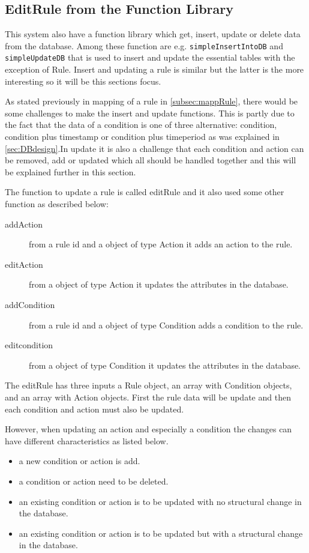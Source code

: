 \subsection{EditRule from the Function Library}
\label{subsec:dbRule}
This system also have a function library which get, insert, update or delete data from the database. Among these function are e.g. \texttt{simpleInsertIntoDB} and \texttt{simpleUpdateDB} that is used to insert and update the essential tables with the exception of Rule. Insert and updating a rule is similar but the latter is the more interesting so it will be this sections focus.

As stated previously in mapping of a rule in \vref{subsec:mappRule}, there would be some challenges to make the insert and update functions. This is partly due to the fact that the data of a condition  is one of three alternative: condition, condition plus timestamp or condition plus timeperiod as was explained in \vref{sec:DBdesign}.In update it is also a challenge that each condition and action can be removed, add or updated which all should be handled together and this will be explained further in this section. 

The function to update a rule is called editRule and it also used some other function as described below:

\begin{description}
	\item[addAction] from a rule id and a object of type Action it adds an action to the rule.
	\item[editAction] from a object of type Action it updates the attributes in the database.   
	\item[addCondition] from a rule id and a object of type Condition adds a condition to the rule.
	\item[editcondition] from a object of type Condition it updates the attributes in the database.   
\end{description}

The editRule has three inputs a Rule object, an array with Condition objects, and an array with Action objects. First the rule data will be update and then each condition and action must also be updated. 

However, when updating an action and especially a condition the changes can have different characteristics as listed below.

\begin{itemize}
	\item a new condition or action is add.
	\item a condition or action need to be deleted.
	\item an existing condition or action is to be updated with no structural change in the database.
	\item an existing condition or action is to be updated but with a structural change in the database.
\end{itemize}

